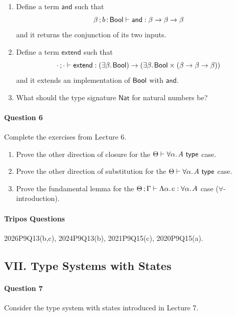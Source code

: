 \documentclass[11pt,a4paper,twoside]{article}
\begin{document}
\begin{enumerate}[label=(\alph*)]
  \item Define a term $\mathsf{and}$ such that
    \[ \beta \, ; b \,{:}\, \mathsf{Bool} \vdash \mathsf{and} : \beta
    \to \beta \to \beta \]
    and it returns the conjunction of its two inputs.

  \item Define a term $\mathsf{extend}$ such that
    \[ \cdot\, ; \cdot \vdash \mathsf{extend} :
      (\exists \beta .\;\! \mathsf{Bool}) \to (\exists \beta .\;\! \mathsf{Bool} \times (\beta \to
    \beta \to \beta)) \]
    and it extends an implementation of $\mathsf{Bool}$ with $\mathsf{and}$.

  \item What should the type signature $\mathsf{Nat}$ for natural numbers be?
\end{enumerate}

\paragraph{Question 6} Complete the exercises from Lecture 6.

\begin{enumerate}[label=(\alph*)]
  \item Prove the other direction of closure for the $\Theta \vdash
    \forall \alpha .\;\! A\ \mathsf{type}$ case.

  \item Prove the other direction of substitution for the $\Theta
    \vdash \forall \alpha .\;\! A\ \mathsf{type}$ case.

  \item Prove the fundamental lemma for the $\Theta \, ; \Gamma
    \vdash \Lambda \alpha .\;\! e : \forall \alpha .\;\! A$ case
    ($\forall$-introduction).

\end{enumerate}

\paragraph{Tripos Questions} 2026P9Q13(b,c), 2024P9Q13(b), 2021P9Q15(c), 2020P9Q15(a).

\subsection*{VII. Type Systems with States}

\paragraph{Question 7} Consider the type system with states
introduced in Lecture 7.
\end{document}
